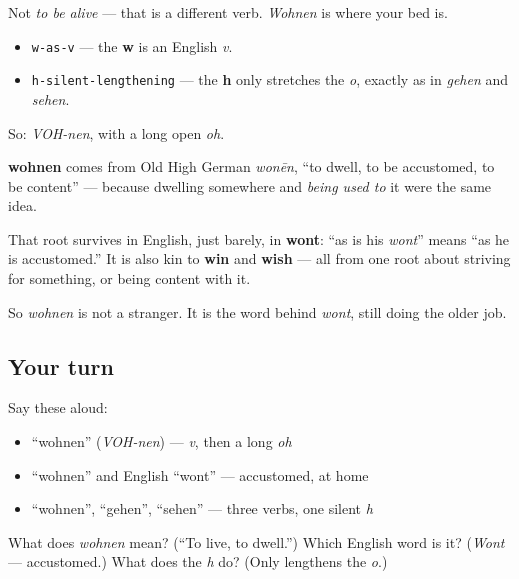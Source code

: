 Not \emph{to be alive} — that is a different verb. \emph{Wohnen} is where your bed is.

\begin{sounds}
\begin{itemize}
\raggedright
  \item \texttt{w-as-v} — the \textbf{w} is an English \emph{v}.
  \item \texttt{h-silent-lengthening} — the \textbf{h} only stretches the \emph{o}, exactly as in \emph{gehen} and \emph{sehen}.
\end{itemize}

So: \emph{VOH-nen}, with a long open \emph{oh}.
\end{sounds}

\begin{cousinweb}
\textbf{wohnen} comes from Old High German \emph{wonēn}, \textquotedblleft{}to dwell, to be accustomed, to be content\textquotedblright{} — because dwelling somewhere and \emph{being used to} it were the same idea.

That root survives in English, just barely, in \textbf{wont}: \textquotedblleft{}as is his \emph{wont}\textquotedblright{} means \textquotedblleft{}as he is accustomed.\textquotedblright{} It is also kin to \textbf{win} and \textbf{wish} — all from one root about striving for something, or being content with it.

So \emph{wohnen} is not a stranger. It is the word behind \emph{wont}, still doing the older job.
\end{cousinweb}

\subsection*{Your turn}
Say these aloud:

\begin{itemize}
\raggedright
  \item \textquotedblleft{}wohnen\textquotedblright{} (\emph{VOH-nen}) — \emph{v}, then a long \emph{oh}
  \item \textquotedblleft{}wohnen\textquotedblright{} and English \textquotedblleft{}wont\textquotedblright{} — accustomed, at home
  \item \textquotedblleft{}wohnen\textquotedblright{}, \textquotedblleft{}gehen\textquotedblright{}, \textquotedblleft{}sehen\textquotedblright{} — three verbs, one silent \emph{h}
\end{itemize}

\begin{tcolorbox}[breakable,colback=teal!4,colframe=teal!35!black,title={Before you move on}]
What does \emph{wohnen} mean? (\textquotedblleft{}To live, to dwell.\textquotedblright{}) Which English word is it? (\emph{Wont} — accustomed.) What does the \emph{h} do? (Only lengthens the \emph{o}.)
\end{tcolorbox}
